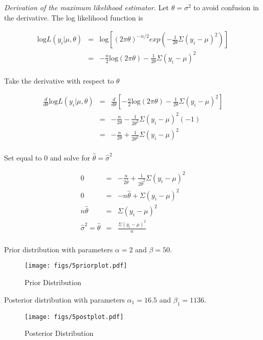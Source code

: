 \documentclass[12pt]{article}
\begin{document}
\noindent \textit{Derivation of the maximum likelihood estimator.}  Let $\theta=\sigma^2$ to avoid confusion in the derivative.  The log likelihood function is

\begin{eqnarray*}
\mathrm{log}L(y_i|\mu,\theta) &=& \mathrm{log}\left[(2\pi\theta)^{-n/2}exp\left(-\frac{1}{2\theta}\Sigma(y_i-\mu)^2\right)\right] \\
&=& -\frac{n}{2}\mathrm{log}(2\pi\theta)-\frac{1}{2\theta}\Sigma(y_i-\mu)^2 \\
\end{eqnarray*}

\noindent Take the derivative with respect to $\theta$

\begin{eqnarray*}
\frac{d}{d\theta}\mathrm{log}L(y_i|\mu,\theta) &=& \frac{d}{d\theta}\left[-\frac{n}{2}\mathrm{log}(2\pi\theta)-\frac{1}{2\theta}\Sigma(y_i-\mu)^2\right] \\
&=& -\frac{n}{2\theta}-\frac{1}{2\theta^2}\Sigma(y_i-\mu)^2(-1) \\
&=& -\frac{n}{2\theta}+\frac{1}{2\theta^2}\Sigma(y_i-\mu)^2 \\
\end{eqnarray*}

\noindent Set equal to 0 and solve for $\hat{\theta}=\hat{\sigma}^2$

\begin{eqnarray*}
0 &=& -\frac{n}{2\hat{\theta}}+\frac{1}{2\hat{\theta}^2}\Sigma(y_i-\mu)^2 \\
0 &=& -n\hat{\theta}+\Sigma(y_i-\mu)^2 \\
n\hat{\theta} &=& \Sigma(y_i-\mu)^2 \\
\hat{\sigma}^2=\hat{\theta} &=& \frac{\Sigma(y_i-\mu)^2}{n} \\
\end{eqnarray*}

\noindent Prior distribution with parameters $\alpha=2$ and $\beta=50$.

\begin{figure}[H]
\begin{center}
\texttt{[image: figs/5priorplot.pdf]}
\caption{Prior Distribution}
\end{center}
\end{figure}

\noindent Posterior distribution with parameters $\alpha_1=16.5$ and $\beta_1=1136$.

\begin{figure}[H]
\begin{center}
\texttt{[image: figs/5postplot.pdf]}
\caption{Posterior Distribution}
\end{center}
\end{figure}
\end{document}
